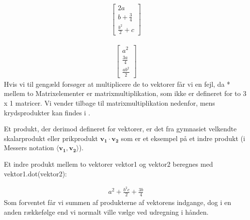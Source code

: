 \documentclass[letterpaper,10pt,english]{jupyterBook}
\begin{document}
\begin{sphinxVerbatim}[commandchars=\\\{\}]
     
\end{sphinxVerbatim}
\begin{equation*}
\begin{split}\displaystyle \left[\begin{matrix}2 a\\b + \frac{3}{4}\\\frac{b^{2}}{2} + c\end{matrix}\right]\end{split}
\end{equation*}
\begin{sphinxVerbatim}[commandchars=\\\{\}]
         
\end{sphinxVerbatim}
\begin{equation*}
\begin{split}\displaystyle \left[\begin{matrix}a^{2}\\\frac{3 a}{4}\\\frac{a b^{2}}{2}\end{matrix}\right]\end{split}
\end{equation*}
Hvis vi til gengæld forsøger at multiplicere de to vektorer får vi en fejl, da * mellem to Matrix\sphinxhyphen{}elementer er matrix\sphinxhyphen{}multiplikation, som ikke er defineret for to 3 x 1 matricer. Vi vender tilbage til matrixmultiplikation nedenfor, mens krydsprodukter kan findes i {\hyperref[\detokenize{notebooks/sympy/Notebook_LinAlg_2::doc}]{}}.

Et produkt, der derimod  defineret for vektorer, er det fra gymnasiet velkendte skalarprodukt eller prikprodukt \(\mathbf{v_1} \cdot \mathbf{v_2}\) som er et eksempel på et indre produkt (i Messers notation \(\langle \mathbf{v_1}, \mathbf{v_2}\rangle\)).

Et indre produkt mellem to vektorer vektor1 og vektor2 beregnes med vektor1.dot(vektor2):

\begin{sphinxVerbatim}[commandchars=\\\{\}]
\end{sphinxVerbatim}
\begin{equation*}
\begin{split}\displaystyle a^{2} + \frac{b^{2} c}{2} + \frac{3 b}{4}\end{split}
\end{equation*}
Som forventet får vi summen af produkterne af vektorens indgange, dog i en anden rækkefølge end vi normalt ville vælge ved udregning i hånden.
\end{document}
